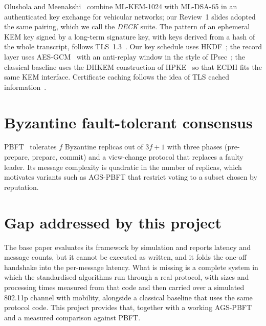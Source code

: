 Olushola and Meenakshi~\cite{olushola} combine ML-KEM-1024 with ML-DSA-65 in
an authenticated key exchange for vehicular networks; our Review~1 slides
adopted the same pairing, which we call the \emph{DECK} suite. The pattern of
an ephemeral KEM key signed by a long-term signature key, with keys derived
from a hash of the whole transcript, follows TLS~1.3~\cite{tls13}. Our key
schedule uses HKDF~\cite{hkdf}; the record layer uses AES-GCM~\cite{gcm} with
an anti-replay window in the style of IPsec~\cite{esp}; the classical baseline
uses the DHKEM construction of HPKE~\cite{hpke} so that ECDH fits the same
KEM interface. Certificate caching follows the idea of TLS cached
information~\cite{rfc7924}.

\section{Byzantine fault-tolerant consensus}

PBFT~\cite{pbft} tolerates $f$ Byzantine replicas out of $3f+1$ with three
phases (pre-prepare, prepare, commit) and a view-change protocol that replaces
a faulty leader. Its message complexity is quadratic in the number of
replicas, which motivates variants such as AGS-PBFT that restrict voting to a
subset chosen by reputation.

\section{Gap addressed by this project}

The base paper evaluates its framework by simulation and reports latency and
message counts, but it cannot be executed as written, and it folds the
one-off handshake into the per-message latency. What is missing is a complete
system in which the standardised algorithms run through a real protocol, with sizes and
processing times measured from that code and then carried over a simulated
802.11p channel with mobility, alongside a classical baseline that uses the
same protocol code. This project provides that, together with a working
AGS-PBFT and a measured comparison against PBFT.
